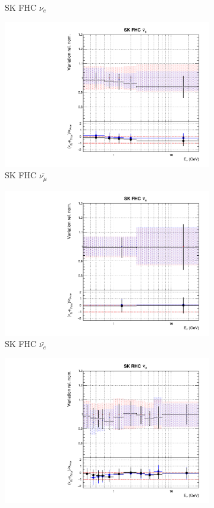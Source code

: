 \begin{figure}[t]
\begin{subfigure}{0.24\textwidth}
  \caption{SK FHC $\nu_e$}
  \label{fig:}
\end{subfigure}
\begin{subfigure}{0.24\textwidth}
  \centering
  \includegraphics[width=0.95\linewidth]{figs/rhcmpasmvflux10}
  \caption{SK FHC $\bar{\nu_{\mu}}$}
  \label{fig:}
\end{subfigure}
\begin{subfigure}{0.24\textwidth}
  \centering
  \includegraphics[width=0.95\linewidth]{figs/rhcmpasmvflux11}
  \caption{SK FHC $\bar{\nu_e}$}
  \label{fig:}
\end{subfigure}
\begin{subfigure}{0.24\textwidth}
  \centering
  \includegraphics[width=0.95\linewidth]{figs/rhcmpasmvflux12}

\end{subfigure}
\end{figure}

